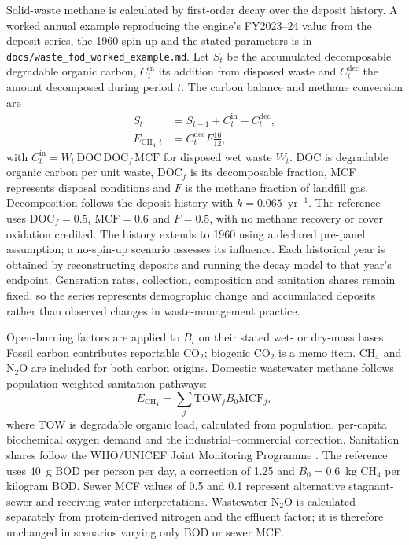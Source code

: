 \documentclass[essd]{copernicus}
\begin{document}
Solid-waste methane is calculated by first-order decay over the deposit history. A worked annual example reproducing the engine's FY2023--24 value from the deposit series, the 1960 spin-up and the stated parameters is in \texttt{docs/waste\_fod\_worked\_example.md}. Let $S_t$ be the accumulated decomposable degradable organic carbon, $C_t^{\mathrm{in}}$ its addition from disposed waste and $C_t^{\mathrm{dec}}$ the amount decomposed during period $t$. The carbon balance and methane conversion are
\begin{align}
 S_t&=S_{t-1}+C_t^{\mathrm{in}}-C_t^{\mathrm{dec}},\\
 E_{\mathrm{CH_4},t}&=C_t^{\mathrm{dec}}F\frac{16}{12},
 \label{eq:waste_fod}
\end{align}
with $C_t^{\mathrm{in}}=W_t\,\mathrm{DOC}\,\mathrm{DOC}_f\,\mathrm{MCF}$ for disposed wet waste $W_t$. DOC is degradable organic carbon per unit waste, $\mathrm{DOC}_f$ is its decomposable fraction, MCF represents disposal conditions and $F$ is the methane fraction of landfill gas. Decomposition follows the deposit history with $k=0.065$~yr$^{-1}$. The reference uses $\mathrm{DOC}_f=0.5$, $\mathrm{MCF}=0.6$ and $F=0.5$, with no methane recovery or cover oxidation credited. The history extends to 1960 using a declared pre-panel assumption; a no-spin-up scenario assesses its influence. Each historical year is obtained by reconstructing deposits and running the decay model to that year's endpoint. Generation rates, collection, composition and sanitation shares remain fixed, so the series represents demographic change and accumulated deposits rather than observed changes in waste-management practice.

Open-burning factors are applied to $B_t$ on their stated wet- or dry-mass bases. Fossil carbon contributes reportable CO$_2$; biogenic CO$_2$ is a memo item. CH$_4$ and N$_2$O are included for both carbon origins. Domestic wastewater methane follows population-weighted sanitation pathways:
\begin{equation}
 E_{\mathrm{CH_4}}=\sum_j \mathrm{TOW}_j B_0\mathrm{MCF}_j,
 \label{eq:wastewater_methane}
\end{equation}
where TOW is degradable organic load, calculated from population, per-capita biochemical oxygen demand and the industrial--commercial correction. Sanitation shares follow the WHO/UNICEF Joint Monitoring Programme \citep{JMP2023}. The reference uses 40~g BOD per person per day, a correction of 1.25 and $B_0=0.6$~kg CH$_4$ per kilogram BOD. Sewer MCF values of 0.5 and 0.1 represent alternative stagnant-sewer and receiving-water interpretations. Wastewater N$_2$O is calculated separately from protein-derived nitrogen and the effluent factor; it is therefore unchanged in scenarios varying only BOD or sewer MCF.
\end{document}
